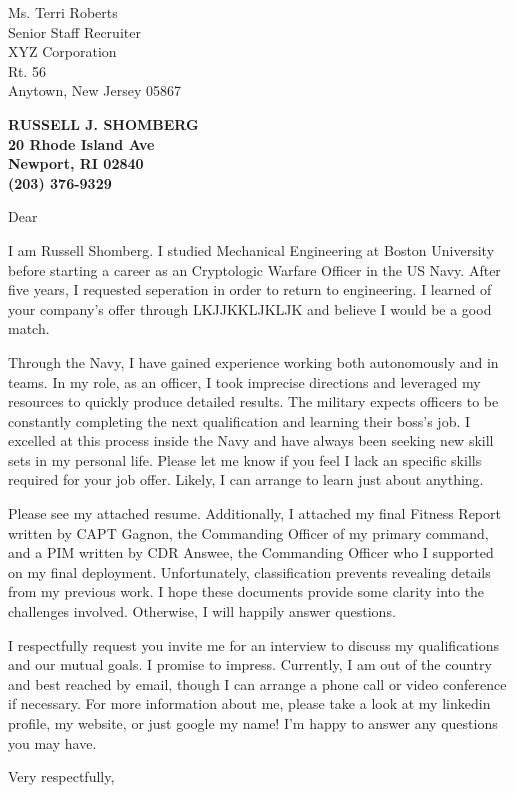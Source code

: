 \documentclass[11pt]{letter} %
\begin{document}
\signature{Russell J. Shomberg}                  %
\longindentation=0pt                       %
\let\raggedleft\raggedright                %
 
\begin{letter}
  {Ms. Terri Roberts \\
    Senior Staff Recruiter \\
    XYZ Corporation \\
    Rt. 56 \\
    Anytown, New Jersey 05867} 

\begin{center}
\large\bf RUSSELL J. SHOMBERG \\
20 Rhode Island Ave \\ Newport, RI 02840 \\ (203) 376-9329
\end{center} 


 
\opening{Dear } 
 
\noindent I am Russell Shomberg. I studied Mechanical Engineering at Boston University before starting a career as an Cryptologic Warfare Officer in the US Navy. After five years, I requested seperation in order to return to engineering. I learned of your company's offer through LKJJKKLJKLJK and believe I would be a good match.

\noindent Through the Navy, I have gained experience working both autonomously and in teams. In my role, as an officer, I took imprecise directions and leveraged my resources to quickly produce detailed results. The military expects officers to be constantly completing the next qualification and learning their boss's job. I excelled at this process inside the Navy and have always been seeking new skill sets in my personal life. Please let me know if you feel I lack an specific skills required for your job offer. Likely, I can arrange to learn just about anything.

\noindent Please see my attached resume. Additionally, I attached my final Fitness Report written by CAPT Gagnon, the Commanding Officer of my primary command, and a PIM written by CDR Answee, the Commanding Officer who I supported on my final deployment. Unfortunately, classification prevents revealing details from my previous work. I hope these documents provide some clarity into the challenges involved. Otherwise, I will happily answer questions.

\noindent I respectfully request you invite me for an interview to discuss my qualifications and our mutual goals. I promise to impress. Currently, I am out of the country and best reached by email, though I can arrange a phone call or video conference if necessary. For more information about me, please take a look at my linkedin profile, my website, or just google my name! I'm happy to answer any questions you may have.


 

 
\closing{Very respectfully,}
 
 

\end{letter}
 
\end{document}

